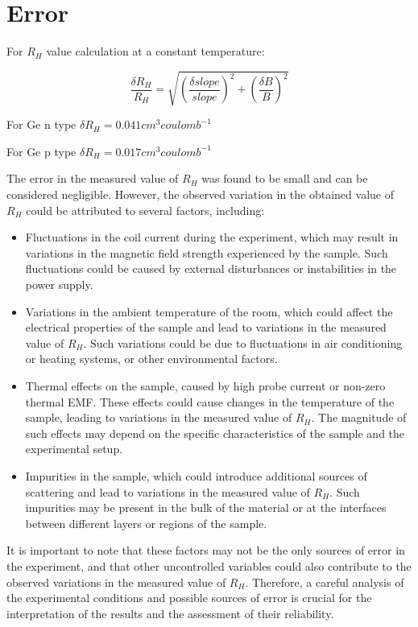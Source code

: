 \section{Error}
	For $R_H $ value calculation at a constant temperature:

	$$\frac{\delta R_H}{R_H}=\sqrt{
	\left(\frac{\delta slope}{slope}\right)^2+\left(\frac{\delta B}{B}\right)^2}$$

	For Ge n type $\delta R_H=0.041 cm^3 coulomb^{-1}$

	For Ge p type $\delta R_H= 0.017 cm^3 coulomb^{-1}$

	The error in the measured value of $R_H$ was found to be small and can be considered negligible. However, the observed variation in the obtained value of $R_H$ could be attributed to several factors, including:

	\begin{itemize}
		\item Fluctuations in the coil current during the experiment, which may result in variations in the magnetic field strength experienced by the sample. Such fluctuations could be caused by external disturbances or instabilities in the power supply.
		\item Variations in the ambient temperature of the room, which could affect the electrical properties of the sample and lead to variations in the measured value of $R_H$. Such variations could be due to fluctuations in air conditioning or heating systems, or other environmental factors.
		\item Thermal effects on the sample, caused by high probe current or non-zero thermal EMF. These effects could cause changes in the temperature of the sample, leading to variations in the measured value of $R_H$. The magnitude of such effects may depend on the specific characteristics of the sample and the experimental setup.
		\item Impurities in the sample, which could introduce additional sources of scattering and lead to variations in the measured value of $R_H$. Such impurities may be present in the bulk of the material or at the interfaces between different layers or regions of the sample.
	\end{itemize}

	It is important to note that these factors may not be the only sources of error in the experiment, and that other uncontrolled variables could also contribute to the observed variations in the measured value of $R_H$. Therefore, a careful analysis of the experimental conditions and possible sources of error is crucial for the interpretation of the results and the assessment of their reliability.